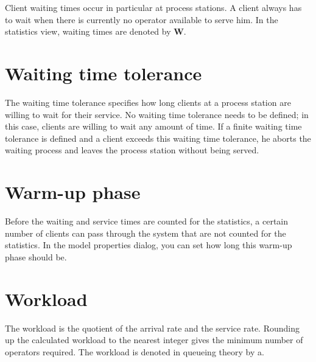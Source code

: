 Client waiting times occur in particular at process stations.
A client always has to wait when there is currently no operator available to serve him.
In the statistics view, waiting times are denoted by \textbf{W}.

\section*{Waiting time tolerance}


The waiting time tolerance specifies how long clients at a process station
are willing to wait for their service. No waiting time tolerance needs to be defined; in this case, clients are
willing to wait any amount of time. If a finite waiting time tolerance is defined and a client exceeds this
waiting time tolerance, he aborts the waiting process and leaves the process station without being served.

\section*{Warm-up phase}


Before the waiting and service times are counted for the statistics, a certain number of clients can pass through
the system that are not counted for the statistics. In the model properties dialog,
you can set how long this warm-up phase should be.

\section*{Workload}


The workload is the quotient of the arrival rate and the service rate. Rounding up the calculated workload
to the nearest integer gives the minimum number of operators required. The workload is denoted
in queueing theory by a.